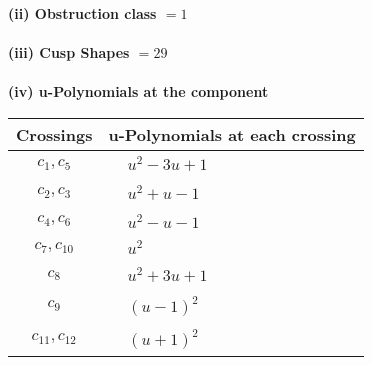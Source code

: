 \documentclass[1p]{elsarticle_modified}
\theoremstyle{definition}
\begin{document}
\flushleft \textbf{(ii) Obstruction class $= 1$}\\~\\
\flushleft \textbf{(iii) Cusp Shapes $= 29$}\\~\\
\newpage\renewcommand{\arraystretch}{1}
\flushleft \textbf{(iv) u-Polynomials at the component}\newline \\
\begin{tabular}{m{50pt}|m{274pt}}
Crossings & \hspace{64pt}u-Polynomials at each crossing \\
\hline $$\begin{aligned}c_{1},c_{5}\end{aligned}$$&$\begin{aligned}
&u^2-3 u+1
\end{aligned}$\\
\hline $$\begin{aligned}c_{2},c_{3}\end{aligned}$$&$\begin{aligned}
&u^2+u-1
\end{aligned}$\\
\hline $$\begin{aligned}c_{4},c_{6}\end{aligned}$$&$\begin{aligned}
&u^2- u-1
\end{aligned}$\\
\hline $$\begin{aligned}c_{7},c_{10}\end{aligned}$$&$\begin{aligned}
&u^2
\end{aligned}$\\
\hline $$\begin{aligned}c_{8}\end{aligned}$$&$\begin{aligned}
&u^2+3 u+1
\end{aligned}$\\
\hline $$\begin{aligned}c_{9}\end{aligned}$$&$\begin{aligned}
&(u-1)^2
\end{aligned}$\\
\hline $$\begin{aligned}c_{11},c_{12}\end{aligned}$$&$\begin{aligned}
&(u+1)^2
\end{aligned}$\\
\hline
\end{tabular}\\~\\
\end{document}
